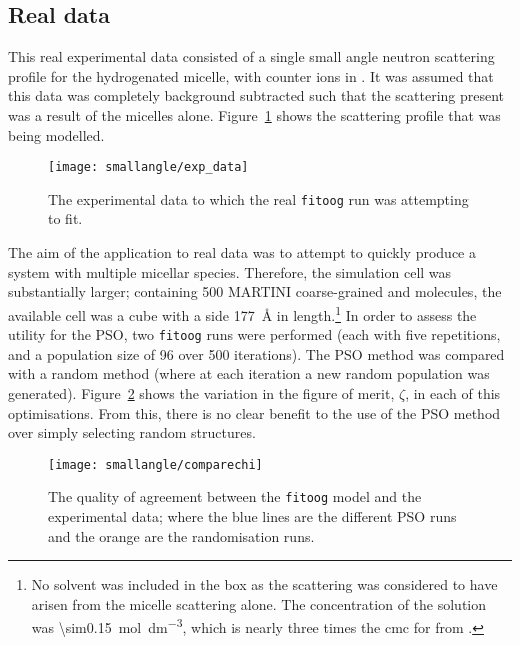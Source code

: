 \subsection{Real data}
\label{sec:real_data}
This real experimental data consisted of a single small angle neutron scattering profile for the hydrogenated  micelle, with  counter ions in .
It was assumed that this data was completely background subtracted such that the scattering present was a result of the micelles alone.
Figure~\ref{fig:expdata} shows the scattering profile that was being modelled.
%
\begin{figure}
    \centering
    \texttt{[image: smallangle/exp\_data]}
    \caption{The experimental data to which the real \texttt{fitoog} run was attempting to fit.}
    \label{fig:expdata}
\end{figure}
%

The aim of the application to real data was to attempt to quickly produce a system with multiple micellar species.
Therefore, the simulation cell was substantially larger; containing 500 MARTINI coarse-grained  and  molecules, the available cell was a cube with a side \SI{177}{\angstrom} in length.\footnote{No solvent was included in the box as the scattering was considered to have arisen from the micelle scattering alone. The concentration of the solution was \SI{\sim0.15}{\mol\deci\meter^{-3}}, which is nearly three times the cmc for  from \cite{rodriguez_surface_2007}.}
In order to assess the utility for the PSO, two \texttt{fitoog} runs were performed (each with five repetitions, and a population size of 96 over 500 iterations).
The PSO method was compared with a random method (where at each iteration a new random population was generated).
Figure~\ref{fig:chi} shows the variation in the figure of merit, $\zeta$, in each of this optimisations.
From this, there is no clear benefit to the use of the PSO method over simply selecting random structures.
%
\begin{figure}
    \centering
    \texttt{[image: smallangle/comparechi]}
    \caption{The quality of agreement between the \texttt{fitoog} model and the experimental data; where the blue lines are the different PSO runs and the orange are the randomisation runs.}
    \label{fig:chi}
\end{figure}
%


